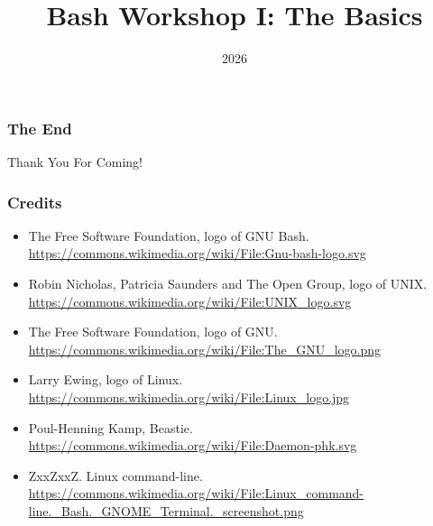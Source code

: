 \documentclass{beamer}
\title{Bash Workshop I: The Basics}
\institute{Tech GC}
\date{2026}
\begin{document}
\frame{\titlepage}






\begin{frame}
\frametitle{The End}
\vspace{1cm}
\centering \Huge {Thank You For Coming!}
\end{frame}

\begin{frame}
\frametitle{Credits}
\begin{itemize}
    \item The Free Software Foundation, logo of GNU Bash.
        \url{https://commons.wikimedia.org/wiki/File:Gnu-bash-logo.svg}
    \item Robin Nicholas, Patricia Saunders and The Open Group, logo of UNIX.
        \url{https://commons.wikimedia.org/wiki/File:UNIX_logo.svg}
    \item The Free Software Foundation, logo of GNU.
        \url{https://commons.wikimedia.org/wiki/File:The_GNU_logo.png}
    \item Larry Ewing, logo of Linux.
        \url{https://commons.wikimedia.org/wiki/File:Linux_logo.jpg}
    \item Poul-Henning Kamp, Beastie.
        \url{https://commons.wikimedia.org/wiki/File:Daemon-phk.svg}
    \item ZxxZxxZ. Linux command-line.
        \url{https://commons.wikimedia.org/wiki/File:Linux_command-line._Bash._GNOME_Terminal._screenshot.png}
\end{itemize}
\end{frame}
\end{document}
